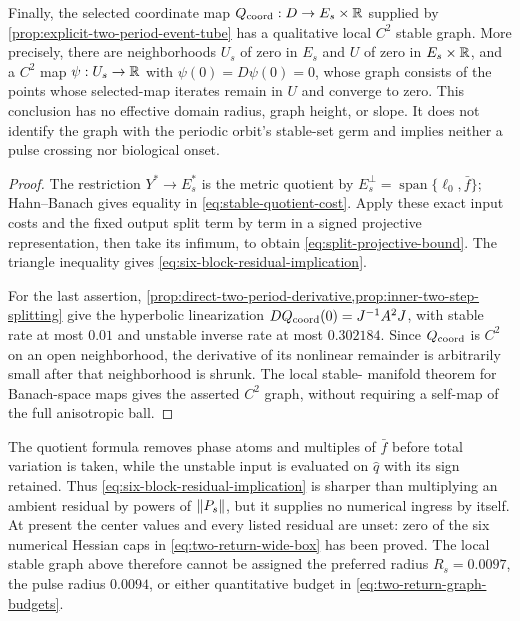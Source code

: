 \begin{proposition}
Finally, the selected coordinate map
\(Q_{\rm coord}:D\to E_s\times\mathbb R\) supplied by
\cref{prop:explicit-two-period-event-tube} has a qualitative local
\(C^2\) stable graph.  More precisely, there are neighborhoods \(U_s\) of
zero in \(E_s\) and \(U\) of zero in \(E_s\times\mathbb R\), and a \(C^2\) map
\(\psi:U_s\to\mathbb R\) with \(\psi(0)=D\psi(0)=0\), whose graph consists of
the points whose selected-map iterates remain in \(U\) and converge to zero.
This conclusion has no effective domain radius, graph height, or slope.  It
does not identify the graph with the periodic orbit's stable-set germ and
implies neither a pulse crossing nor biological onset.
\end{proposition}

\begin{proof}
The restriction \(Y^*\to E_s^*\) is the metric quotient by
\(E_s^\perp=\operatorname{span}\{\ell_0,\bar f\}\); Hahn--Banach gives
equality in \cref{eq:stable-quotient-cost}.  Apply these exact input costs
and the fixed output split term by term in a signed projective
representation, then take its infimum, to obtain
\cref{eq:split-projective-bound}.  The triangle inequality gives
\cref{eq:six-block-residual-implication}.

For the last assertion,
\cref{prop:direct-two-period-derivative,prop:inner-two-step-splitting} give
the hyperbolic linearization
\(DQ_{\rm coord}(0)=J^{-1}A^2J\), with stable rate at most \(0.01\) and
unstable inverse rate at most \(0.302184\).  Since \(Q_{\rm coord}\) is
\(C^2\) on an open neighborhood, the derivative of its nonlinear remainder
is arbitrarily small after that neighborhood is shrunk.  The local stable-
manifold theorem for Banach-space maps gives the asserted \(C^2\) graph,
without requiring a self-map of the full anisotropic ball.
\end{proof}

The quotient formula removes phase atoms and multiples of \(\bar f\) before
total variation is taken, while the unstable input is evaluated on
\(\widehat q\) with its sign retained.  Thus
\cref{eq:six-block-residual-implication} is sharper than multiplying an
ambient residual by powers of \(\left\lVert P_s\right\rVert\), but it supplies no numerical
ingress by itself.  At present the center values and every listed residual
are unset: zero of the six numerical Hessian caps in
\cref{eq:two-return-wide-box} has been proved.  The local stable graph above
therefore cannot be assigned the preferred radius \(R_s=0.0097\), the pulse
radius \(0.0094\), or either quantitative budget in
\cref{eq:two-return-graph-budgets}.

